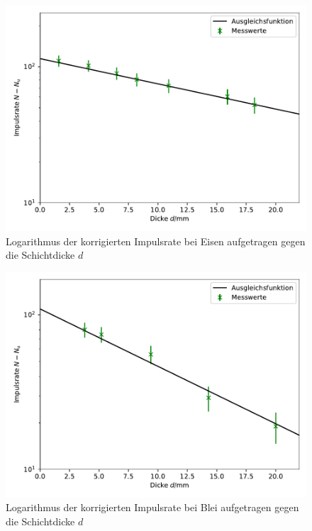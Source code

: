 \begin{figure}
  \centering
  \includegraphics{Bilder/Eisen.pdf}
  \caption{Logarithmus der korrigierten Impulsrate bei Eisen aufgetragen gegen die Schichtdicke $d$}
  \label{fig:Eisen}
\end{figure}
\begin{figure}
  \centering
  \includegraphics{Bilder/Blei.pdf}
  \caption{Logarithmus der korrigierten Impulsrate bei Blei aufgetragen gegen die Schichtdicke $d$}
  \label{fig:Blei}
\end{figure}

